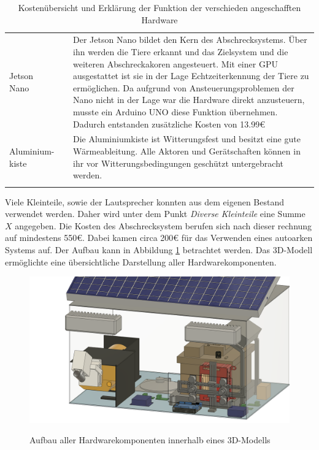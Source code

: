 \begin{longtable}{ p{}|p{}|p{} }
    \\
    Jetson Nano
    & \centering189
    &  Der Jetson Nano bildet den Kern des Abschrecksystems. Über ihn werden die Tiere erkannt und das Zielsystem und die weiteren Abschreckakoren angesteuert. Mit einer GPU ausgestattet ist sie in der Lage Echtzeiterkennung der Tiere zu ermöglichen.\newline
    Da aufgrund von Ansteuerungsproblemen der Nano nicht in der Lage war die Hardware direkt anzusteuern, musste ein Arduino UNO diese Funktion übernehmen. Dadurch entstanden zusätzliche Kosten von 13.99€\\
    Aluminium-kiste
    & \centering{109 DM}
    & Die Aluminiumkiste ist Witterungsfest und besitzt eine gute Wärmeableitung. Alle Aktoren und Gerätschaften können in ihr vor Witterungsbedingungen geschützt untergebracht werden.\\
    \caption{Kostenübersicht und Erklärung der Funktion der verschieden angeschafften Hardware}
\end{longtable}

Viele Kleinteile, sowie der Lautsprecher konnten aus dem eigenen Bestand verwendet werden. Daher wird unter dem Punkt \textit{Diverse Kleinteile} eine Summe $X$ angegeben. Die Kosten des Abschrecksystem berufen sich nach dieser rechnung auf mindestens 550€. Dabei kamen circa 200€ für das Verwenden eines autoarken Systems auf. Der Aufbau kann in Abbildung \ref{fig:whole_thing} betrachtet werden. Das 3D-Modell ermöglichte eine übersichtliche Darstellung aller Hardwarekomponenten.

\begin{figure}[H]
    \centering
    \includegraphics[width=\textwidth]{images/whole_box.png}
    \label{fig:whole_thing}
    \caption{Aufbau aller Hardwarekomponenten innerhalb eines 3D-Modells}
\end{figure}
